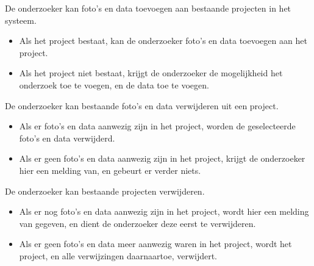 De onderzoeker kan foto's en data toevoegen aan bestaande projecten in het systeem.
\begin{itemize}
	\item Als het project bestaat, kan de onderzoeker foto's en data toevoegen aan het project.
	\item Als het project niet bestaat, krijgt de onderzoeker de mogelijkheid het onderzoek toe te voegen, en de data toe te voegen.
\end{itemize}

De onderzoeker kan bestaande foto's en data verwijderen uit een project.
\begin{itemize}
	\item Als er foto's en data aanwezig zijn in het project, worden de geselecteerde foto's en data verwijderd.
	\item Als er geen foto's en data aanwezig zijn in het project, krijgt de onderzoeker hier een melding van, en gebeurt er verder niets.
\end{itemize}

De onderzoeker kan bestaande projecten verwijderen.
\begin{itemize}
	\item Als er nog foto's en data aanwezig zijn in het project, wordt hier een melding van gegeven, en dient de onderzoeker deze eerst te verwijderen.
	\item Als er geen foto's en data meer aanwezig waren in het project, wordt het project, en alle verwijzingen daarnaartoe, verwijdert.
\end{itemize}